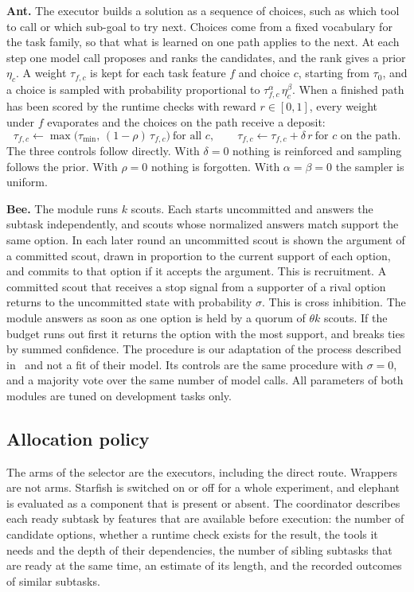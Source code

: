 \documentclass[11pt,a4paper]{article}
\newcommand{\runin}[1]{\textbf{#1}\quad}
\begin{document}
\runin{Ant.}
The executor builds a solution as a sequence of choices, such as which tool to call or which sub-goal to
try next. Choices come from a fixed vocabulary for the task family, so that what is learned on one path
applies to the next. At each step one model call proposes and ranks the candidates, and the rank gives a
prior $\eta_c$. A weight $\tau_{f,c}$ is kept for each task feature $f$ and choice $c$, starting from
$\tau_0$, and a choice is sampled with probability proportional to $\tau_{f,c}^{\alpha}\,\eta_c^{\beta}$.
When a finished path has been scored by the runtime checks with reward $r\in[0,1]$, every weight under $f$
evaporates and the choices on the path receive a deposit:
\[
  \tau_{f,c}\leftarrow\max\bigl(\tau_{\min},\,(1-\rho)\,\tau_{f,c}\bigr)\ \text{for all } c,
  \qquad
  \tau_{f,c}\leftarrow\tau_{f,c}+\delta\,r\ \text{for } c \text{ on the path.}
\]
The three controls follow directly. With $\delta=0$ nothing is reinforced and sampling follows the prior.
With $\rho=0$ nothing is forgotten. With $\alpha=\beta=0$ the sampler is uniform.

\runin{Bee.}
The module runs $k$ scouts. Each starts uncommitted and answers the subtask independently, and scouts whose
normalized answers match support the same option. In each later round an uncommitted scout is shown the
argument of a committed scout, drawn in proportion to the current support of each option, and commits to
that option if it accepts the argument. This is recruitment. A committed scout that receives a stop signal
from a supporter of a rival option returns to the uncommitted state with probability $\sigma$. This is
cross inhibition. The module answers as soon as one option is held by a quorum of $\theta k$ scouts. If the
budget runs out first it returns the option with the most support, and breaks ties by summed confidence.
The procedure is our adaptation of the process described in~\cite{seeley2012} and not a fit of their model.
Its controls are the same procedure with $\sigma=0$, and a majority vote over the same number of model
calls. All parameters of both modules are tuned on development tasks only.

\subsection{Allocation policy}

The arms of the selector are the executors, including the direct route. Wrappers are not arms. Starfish is
switched on or off for a whole experiment, and elephant is evaluated as a component that is present or
absent. The coordinator describes each ready subtask by features that are available before execution: the
number of candidate options, whether a runtime check exists for the result, the tools it needs and the
depth of their dependencies, the number of sibling subtasks that are ready at the same time, an estimate of
its length, and the recorded outcomes of similar subtasks.
\end{document}
